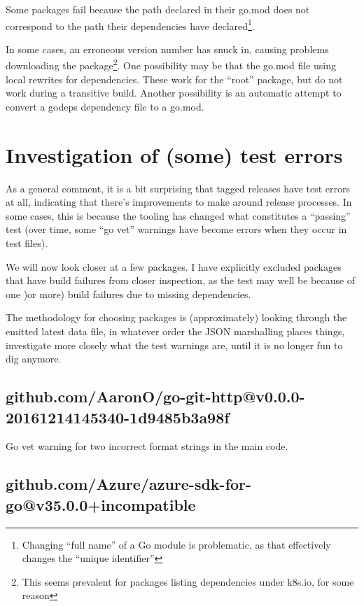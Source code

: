 \documentclass[a4paper]{paper}
\begin{document}
Some packages fail because the path declared in their go.mod does not
correspond to the path their dependencies have
declared\footnote{Changing ``full name'' of a Go module is
  problematic, as that effectively changes the ``unique identifier''}.

In some cases, an erroneous version number has snuck in, causing
problems downloading the package\footnote{This seems prevalent for
  packages listing dependencies under k8s.io, for some reason}. One possibility
may be that the go.mod file using local rewrites for
dependencies. These work for the ``root'' package, but do not work
during a transitive build. Another possibility is an automatic attempt to convert a godeps dependency file to a go.mod.

\section{Investigation of (some) test errors}

As a general comment, it is a bit surprising that tagged releases have
test errors at all, indicating that there's improvements to make
around release processes. In some cases, this is because the tooling
has changed what constitutes a ``passing'' test (over time, some ``go
vet'' warnings have become errors when they occur in test files).

We will now look closer at a few packages. I have explicitly excluded
packages that have build failures from closer inspection, as the test
may well be because of one )or more) build failures due to missing
dependencies.

The methodology for choosing packages is (approximately) looking
through the emitted latest data file, in whatever order the JSON
marshalling places things, investigate more closely what the test
warnings are, until it is no longer fun to dig anymore.

\subsection{github.com/AaronO/go-git-http@v0.0.0-20161214145340-1d9485b3a98f}

Go vet warning for two incorrect format strings in the main code.

\subsection{github.com/Azure/azure-sdk-for-go@v35.0.0+incompatible}
\end{document}
